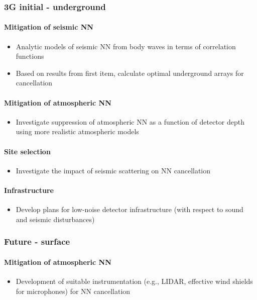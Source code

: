 \subsubsection{3G initial - underground}
\paragraph{Mitigation of seismic NN}
\begin{itemize}
\item Analytic models of seismic NN from body waves in terms of correlation functions
\item Based on results from first item, calculate optimal underground arrays for cancellation
\end{itemize}

\paragraph{Mitigation of atmospheric NN}
\begin{itemize}
\item Investigate suppression of atmospheric NN as a function of detector depth using more realistic atmospheric models
\end{itemize}

\paragraph{Site selection}
\begin{itemize}
\item Investigate the impact of seismic scattering on NN cancellation
\end{itemize}

\paragraph{Infrastructure}
\begin{itemize}
\item Develop plans for low-noise detector infrastructure (with respect to sound and seismic disturbances)
\end{itemize}

\subsubsection{Future - surface}
\paragraph{Mitigation of atmospheric NN}
\begin{itemize}
\item Development of suitable instrumentation (e.g., LIDAR, effective wind shields for microphones) for NN cancellation
\end{itemize}


